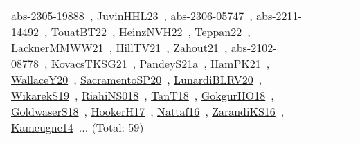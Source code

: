 {\begin{longtable}{lp{3cm}>{\raggedright\arraybackslash}p{6cm}>{\raggedright\arraybackslash}p{6cm}>{\raggedright\arraybackslash}p{8cm}}
\href{works/abs-2305-19888.pdf}{abs-2305-19888}~\cite{abs-2305-19888}, \href{works/JuvinHHL23.pdf}{JuvinHHL23}~\cite{JuvinHHL23}, \href{works/abs-2306-05747.pdf}{abs-2306-05747}~\cite{abs-2306-05747}, \href{works/abs-2211-14492.pdf}{abs-2211-14492}~\cite{abs-2211-14492}, \href{works/TouatBT22.pdf}{TouatBT22}~\cite{TouatBT22}, \href{works/HeinzNVH22.pdf}{HeinzNVH22}~\cite{HeinzNVH22}, \href{works/Teppan22.pdf}{Teppan22}~\cite{Teppan22}, \href{works/LacknerMMWW21.pdf}{LacknerMMWW21}~\cite{LacknerMMWW21}, \href{works/HillTV21.pdf}{HillTV21}~\cite{HillTV21}, \href{works/Zahout21.pdf}{Zahout21}~\cite{Zahout21}, \href{works/abs-2102-08778.pdf}{abs-2102-08778}~\cite{abs-2102-08778}, \href{works/KovacsTKSG21.pdf}{KovacsTKSG21}~\cite{KovacsTKSG21}, \href{works/PandeyS21a.pdf}{PandeyS21a}~\cite{PandeyS21a}, \href{works/HamPK21.pdf}{HamPK21}~\cite{HamPK21}, \href{works/WallaceY20.pdf}{WallaceY20}~\cite{WallaceY20}, \href{works/SacramentoSP20.pdf}{SacramentoSP20}~\cite{SacramentoSP20}, \href{works/LunardiBLRV20.pdf}{LunardiBLRV20}~\cite{LunardiBLRV20}, \href{works/WikarekS19.pdf}{WikarekS19}~\cite{WikarekS19}, \href{works/RiahiNS018.pdf}{RiahiNS018}~\cite{RiahiNS018}, \href{works/TanT18.pdf}{TanT18}~\cite{TanT18}, \href{works/GokgurHO18.pdf}{GokgurHO18}~\cite{GokgurHO18}, \href{works/GoldwaserS18.pdf}{GoldwaserS18}~\cite{GoldwaserS18}, \href{works/HookerH17.pdf}{HookerH17}~\cite{HookerH17}, \href{works/Nattaf16.pdf}{Nattaf16}~\cite{Nattaf16}, \href{works/ZarandiKS16.pdf}{ZarandiKS16}~\cite{ZarandiKS16}, \href{works/Kameugne14.pdf}{Kameugne14}~\cite{Kameugne14}... (Total: 59)\\

\end{longtable}}
